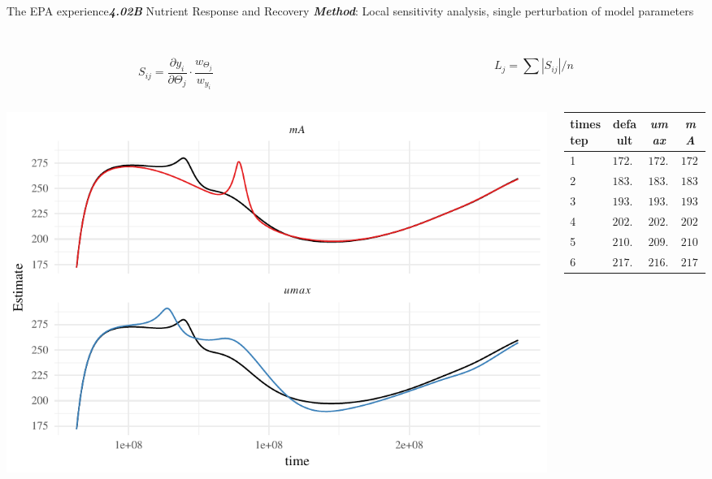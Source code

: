 \documentclass[serif]{beamer}\usepackage[]{graphicx}\usepackage[]{color}
\makeatletter
\def\maxwidth{ %
  \ifdim\Gin@nat@width>\linewidth
    \linewidth
  \else
    \Gin@nat@width
  \fi
}
\newcommand{\emtxt}[1]{\textbf{\textit{#1}}}
\makeatother
\begin{document}
\begin{frame}{The EPA experience}{\emtxt{4.02B} Nutrient Response and Recovery}
\emtxt{Method}: Local sensitivity analysis, single perturbation of model parameters \cite{Soetaert10} \\~\\
\begin{columns}
\begin{column}{0.5\textwidth}
\begin{equation*}
S_{ij} = \frac{\partial y_i}{\partial \Theta_j}\cdot\frac{w_{\Theta_j}}{w_{y_i}}
\end{equation*}
\end{column}
\begin{column}{0.5\textwidth}
\begin{equation*}
L_j = \sum|S_{ij}|/n
\end{equation*}
\end{column}
\end{columns}
\begin{columns}
\begin{column}{0.5\textwidth}


{\centering \includegraphics[width=\maxwidth]{fig/unnamed-chunk-2-1} 

}



\end{column}
\begin{column}{0.5\textwidth}
\begin{table}[!tbp]
{\scriptsize
\begin{center}
\begin{tabular}{lrrr}
\hline\hline
\multicolumn{1}{l}{timestep}&\multicolumn{1}{c}{default}&\multicolumn{1}{c}{\textit{umax}}&\multicolumn{1}{c}{\textit{mA}}\tabularnewline
\hline
1&$172.0$&$172.0$&$172.0$\tabularnewline
2&$183.3$&$183.3$&$183.3$\tabularnewline
3&$193.3$&$193.3$&$193.4$\tabularnewline
4&$202.2$&$202.1$&$202.2$\tabularnewline
5&$210.0$&$209.9$&$210.1$\tabularnewline
6&$217.0$&$216.9$&$217.1$\tabularnewline
\hline
\end{tabular}\end{center}}
\end{table}


\end{column}
\end{columns}
\end{frame}
\end{document}
